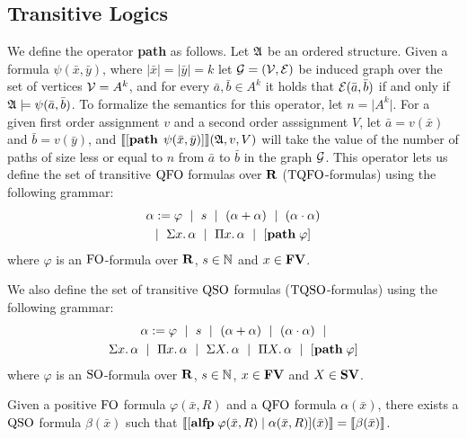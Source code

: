 
\subsection{Transitive Logics}

We define the operator {\bf path} as follows. Let $\mathfrak{A}$ be an ordered structure. Given a formula $\psi(\bar{x},\bar{y})$, where $\vert \bar{x} \vert = \vert \bar{y} \vert = k$ let ${\cal G} = ({\cal V},\cal{E})$ be induced graph over the set of vertices ${\cal V} = A^k$, and for every $\bar{a},\bar{b}\in A^k$ it holds that ${\cal E}(\bar{a},\bar{b})$ if and only if $\mathfrak{A} \models \psi(\bar{a},\bar{b})$. To formalize the semantics for this operator, let $n = \vert A^k \vert$.
For a given first order assignment $v$ and a second order asssignment $V$, let $\bar{a} = v(\bar{x})$ and $\bar{b} = v(\bar{y})$, and ${\llbracket{}{[{\bf path} \; \, \psi(\bar{x},\bar{y})]}\rrbracket}(\mathfrak{A},v,V)$ will take the value of the number of paths of size less or equal to $n$ from $\bar{a}$ to $\bar{b}$ in the graph ${\cal G}$. This operator lets us define the set of transitive ${\rm QFO}$ formulas over $\mathbf{R}$ (${\rm TQFO}$-formulas) using the following grammar:
\begin{multline*} 
	\alpha := \varphi \ \mid \ s \ \mid \ (\alpha + \alpha) \ \mid\ (\alpha \cdot \alpha) \\ \mid \ \Sigma{x}.\, \alpha \ \mid \ \Pi{x}.\, \alpha \ \mid \ [{\bf path} \; \varphi]
\end{multline*}
where $\varphi$ is an ${\rm FO}$-formula over $\mathbf{R}$, $s \in \mathbb{N}$ and $x \in \mathbf{FV}$.

We also define the set of transitive ${\rm QSO}$ formulas (${\rm TQSO}$-formulas) using the following grammar:
\begin{multline*}
	\alpha := \varphi \ \mid \ s \ \mid \ (\alpha + \alpha) \ \mid\ (\alpha \cdot \alpha) \ \mid \\ \Sigma{x}.\, \alpha \ \mid \ \Pi{x}.\, \alpha \ \mid \ \Sigma{X}.\, \alpha \ \mid \ \Pi{X}.\, \alpha \ \mid \ [{\bf path} \; \varphi]
\end{multline*}
where $\varphi$ is an ${\rm SO}$-formula over $\mathbf{R}$, $s \in \mathbb{N}$, $x \in \mathbf{FV}$ and $X \in \mathbf{SV}$.
\begin{theorem}
	Given a positive ${\rm FO}$ formula $\varphi(\bar{x},R)$ and a ${\rm QFO}$ formula $\alpha(\bar{x})$, there exists a ${\rm QSO}$ formula $\beta(\bar{x})$ such that ${\llbracket{}{[{\bf alfp} \; \varphi(\bar{x},R)\mid \alpha(\bar{x},R)](\bar{x})}\rrbracket} = {\llbracket{}{\beta(\bar{x})}\rrbracket}$.
\end{theorem}

